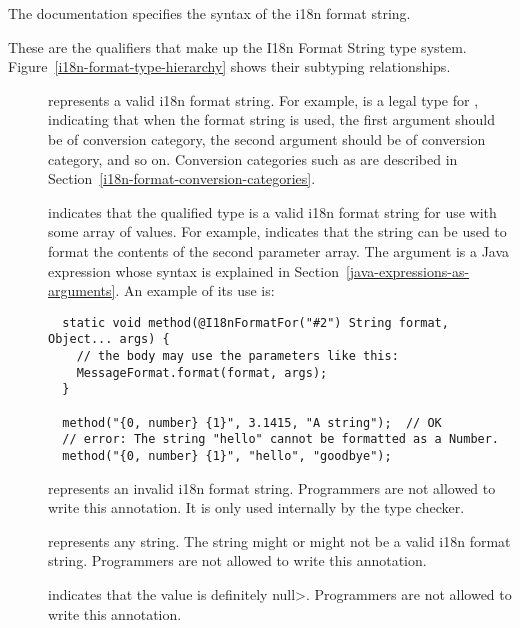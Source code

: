 The  documentation
specifies the syntax of the i18n format string.

These are the qualifiers that make up the I18n Format String type system.
Figure~\ref{i18n-format-type-hierarchy} shows their subtyping relationships.

\begin{description}

\item[]
  represents a valid i18n format string. For example,
   is a legal type for
  , indicating that when the format
  string is used,
  the first argument should be of  conversion category,
  the second argument should be of  conversion category, and so on.
  Conversion categories such as  are described in
  Section~\ref{i18n-format-conversion-categories}.

\item[]
  indicates that the qualified type is a valid i18n format string for use
  with some array of values.  For example,
   indicates that the string can be used to
  format the contents of the second parameter array.
  The argument is a Java expression whose syntax
  is explained in Section~\ref{java-expressions-as-arguments}.
  An example of its use is:

\begin{Verbatim}
  static void method(@I18nFormatFor("#2") String format, Object... args) {
    // the body may use the parameters like this:
    MessageFormat.format(format, args);
  }

  method("{0, number} {1}", 3.1415, "A string");  // OK
  // error: The string "hello" cannot be formatted as a Number.
  method("{0, number} {1}", "hello", "goodbye");
\end{Verbatim}

\item[]
  represents an invalid i18n format string. Programmers are not allowed to
  write this annotation. It is only used internally by the type checker.

\item[]
  represents any string.  The string might or might not be a valid i18n
  format string.  Programmers are not allowed to write this annotation.

\item[]
  indicates that the value is definitely \<null>. Programmers are not allowed
  to write this annotation.
\end{description}

